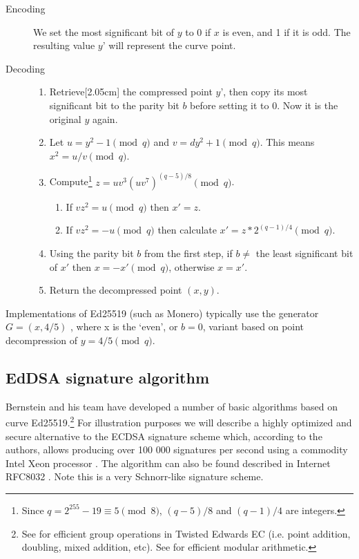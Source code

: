 \begin{description}
	\item[Encoding] We set the most significant bit of $y$ to 0 if $x$ is even, and 1 if it is odd. The resulting value $y’$ will represent the curve point.
	
	\item[Decoding] \hfill
	    \begin{enumerate}
    	    \item Retrieve[2.05cm] the compressed point $y’$, then copy its most significant bit to the parity bit $b$ before setting it to 0. Now it is the original $y$ again.
    	    \item Let \(u = y^2-1 \pmod q\) and \(v = d y^2  + 1 \pmod q\). This means $x^2 = u/v \pmod q$.
    	    \item Compute\footnote{Since $q = 2^{255}-19 \equiv 5 \pmod{8}$, $(q-5)/8$ and $(q-1)/4$ are integers.} \(z = u v^3 (u v^7)^{(q-5)/8} \pmod q\).
            \begin{enumerate}
                \item If \(v z^2 = u \pmod q\) then \(x' = z\).
                \item If \(v z^2 = -u \pmod q\) then calculate \(x' = z*2^{(q-1)/4} \pmod q\).
            \end{enumerate}
            \item Using the parity bit \(b\) from the first step, if $b \ne$ the least significant bit of $x'$ then  \(x = -x' \pmod q\), otherwise \(x = x'\).
            \item Return the decompressed point $(x,y)$.
	    \end{enumerate}
\end{description}

Implementations of Ed25519 (such as Monero) typically use the generator $G = (x,4/5)$ \cite{Bernstein2012}, where x is the `even', or $b = 0$, variant based on point decompression of \(y = 4/5 \pmod q\).


\subsection{EdDSA signature algorithm}
\label{EdDSA_section}

Bernstein and his team have developed a number of basic algorithms based on curve Ed25519.\footnote{\label{group_ops_twisted_edwards_note}See \cite{Bernstein2007} for efficient group operations in Twisted Edwards EC (i.e. point addition, doubling, mixed addition, etc). See \cite{curve25519} for efficient modular arithmetic.}
For illustration purposes we will describe a highly optimized and secure alternative to the ECDSA signature scheme which, according to the authors, allows producing over 100 000 signatures per second using a commodity Intel Xeon processor \cite{Bernstein2012}. The algorithm can also be found described in Internet RFC8032 \cite{rfc8032}. Note this is a very Schnorr-like signature scheme.


